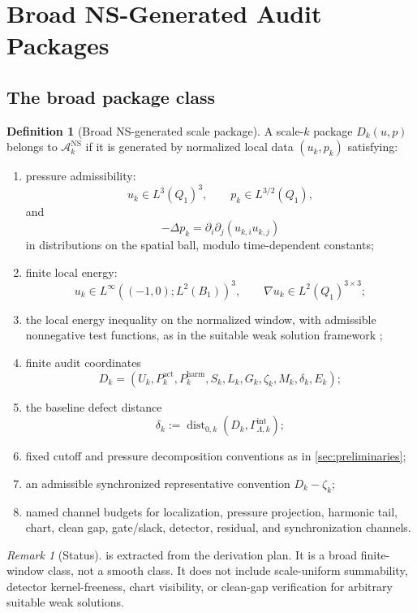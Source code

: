 \documentclass[11pt]{article}
\numberwithin{equation}{section}
\theoremstyle{plain}
\theoremstyle{definition}
\newtheorem{definition}[theorem]{Definition}
\theoremstyle{remark}
\newtheorem{remark}[theorem]{Remark}
\newcommand{\NS}{\mathrm{NS}}
\newcommand{\intg}{\mathrm{int}}
\newcommand{\harm}{\mathrm{harm}}
\newcommand{\Dist}{\operatorname{dist}}
\newcommand{\A}{\mathcal A}
\begin{document}
\section{Broad NS-Generated Audit Packages}
\label{sec:packages}

\subsection{The broad package class}

\begin{definition}[Broad NS-generated scale package]\label{def:broad-package}
A scale-\(k\) package \(D_k(u,p)\) belongs to \(\A_k^{\NS}\) if it is generated
by normalized local data \((u_k,p_k)\) satisfying:
\begin{enumerate}[label=(\alph*)]
  \item pressure admissibility:
  \[
    u_k\in L^3(Q_1)^3,\qquad p_k\in L^{3/2}(Q_1),
  \]
  and
  \[
    -\Delta p_k=\partial_i\partial_j(u_{k,i}u_{k,j})
  \]
  in distributions on the spatial ball, modulo time-dependent constants;
  \item finite local energy:
  \[
    u_k\in L^\infty((-1,0);L^2(B_1))^3,\qquad
    \nabla u_k\in L^2(Q_1)^{3\times3};
  \]
  \item the local energy inequality on the normalized window, with admissible
  nonnegative test functions, as in the suitable weak solution framework \cite{CKN1982,SereginLectureNotes};
  \item finite audit coordinates
  \[
    D_k=(U_k,P_k^{\mathrm{act}},P_k^{\harm},S_k,L_k,G_k,
    \zeta_k,M_k,\delta_k,E_k);
  \]
  \item the baseline defect distance
  \[
    \delta_k:=\Dist_{0,k}(D_k,\Gamma_{\Lambda,k}^{\intg});
  \]
  \item fixed cutoff and pressure decomposition conventions as in
  \cref{sec:preliminaries};
  \item an admissible synchronized representative convention
  \(D_k-\zeta_k\);
  \item named channel budgets for localization, pressure projection, harmonic
  tail, chart, clean gap, gate/slack, detector, residual, and synchronization
  channels.
\end{enumerate}
\end{definition}

\begin{remark}[Status]
 is extracted from the derivation plan.  It is a broad
finite-window class, not a smooth class.  It does not include scale-uniform
summability, detector kernel-freeness, chart visibility, or clean-gap
verification for arbitrary suitable weak solutions.
\end{remark}
\end{document}
